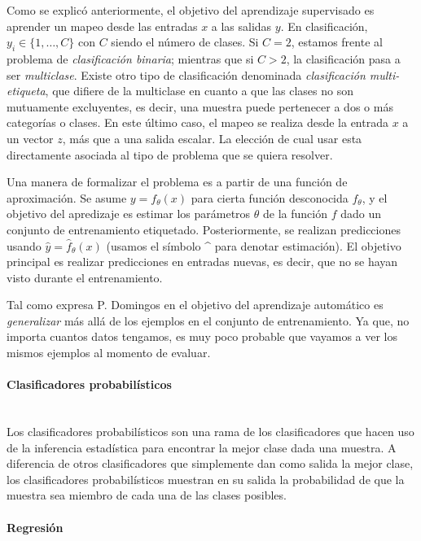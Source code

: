 		Como se explicó anteriormente, el objetivo del aprendizaje supervisado es aprender un mapeo desde las entradas $x$ a las salidas $y$. En clasificación, $y_i \in \{1,\dots,C\}$ con $C$ siendo el número de clases. Si $C=2$, estamos frente al problema de \textit{clasificación binaria}; mientras que si $C>2$, la clasificación pasa a ser \textit{multiclase}. Existe otro tipo de clasificación denominada \textit{clasificación multi-etiqueta}, que difiere de la multiclase en cuanto a que las clases no son mutuamente excluyentes, es decir, una muestra puede pertenecer a dos o más categorías o clases. En este último caso, el mapeo se realiza desde la entrada $x$ a un vector $z$, más que a una salida escalar. La elección de cual usar esta directamente asociada al tipo de problema que se quiera resolver.
		
		Una manera de formalizar el problema es a partir de una función de aproximación. Se asume $y = f_{\theta}(x)$ para cierta función desconocida $f_{\theta}$, y el objetivo del apredizaje es estimar los parámetros $\theta$ de la función $f$ dado un conjunto de entrenamiento etiquetado. Posteriormente, se realizan predicciones usando $\hat{y} = \hat{f}_{\theta}(x)$ (usamos el símbolo \string^ para denotar estimación). El objetivo principal es realizar predicciones en entradas nuevas, es decir, que no se hayan visto durante el entrenamiento.
		
		Tal como expresa P. Domingos en \cite{PDomingo} el objetivo del aprendizaje automático es \textit{generalizar} más allá de los ejemplos en el conjunto de entrenamiento. Ya que, no importa cuantos datos tengamos, es muy poco probable que vayamos a ver los mismos ejemplos al momento de evaluar.
		
	\paragraph{Clasificadores probabilísticos} ~\\

		Los clasificadores probabilísticos son una rama de los clasificadores que hacen uso de la inferencia estadística para encontrar la mejor clase dada una muestra. A diferencia de otros clasificadores que simplemente dan como salida la mejor clase, los clasificadores probabilísticos muestran en su salida la probabilidad de que la muestra sea miembro de cada una de las clases posibles.


	\paragraph{Regresión} ~\\
	
